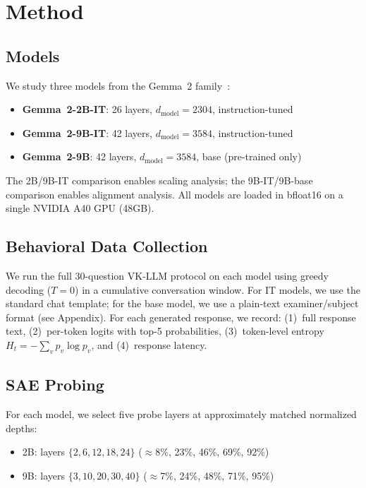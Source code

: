 \documentclass{article}
\begin{document}
\section{Method}
\label{sec:method}

\subsection{Models}

We study three models from the Gemma~2 family~\citep{gemmateam2024gemma2}:
\begin{itemize}
    \item \textbf{Gemma~2-2B-IT}: 26 layers, $d_\text{model}{=}2304$, instruction-tuned
    \item \textbf{Gemma~2-9B-IT}: 42 layers, $d_\text{model}{=}3584$, instruction-tuned
    \item \textbf{Gemma~2-9B}: 42 layers, $d_\text{model}{=}3584$, base (pre-trained only)
\end{itemize}
The 2B/9B-IT comparison enables scaling analysis; the 9B-IT/9B-base comparison enables alignment analysis.
All models are loaded in bfloat16 on a single NVIDIA A40 GPU (48GB).

\subsection{Behavioral Data Collection}

We run the full 30-question VK-LLM protocol on each model using greedy decoding ($T{=}0$) in a cumulative conversation window.
For IT models, we use the standard chat template; for the base model, we use a plain-text examiner/subject format (see Appendix).
For each generated response, we record: (1)~full response text, (2)~per-token logits with top-5 probabilities, (3)~token-level entropy $H_t = -\sum_v p_v \log p_v$, and (4)~response latency.

\subsection{SAE Probing}

For each model, we select five probe layers at approximately matched normalized depths:
\begin{itemize}
    \item 2B: layers $\{2, 6, 12, 18, 24\}$ ($\approx$8\%, 23\%, 46\%, 69\%, 92\%)
    \item 9B: layers $\{3, 10, 20, 30, 40\}$ ($\approx$7\%, 24\%, 48\%, 71\%, 95\%)
\end{itemize}
\end{document}
